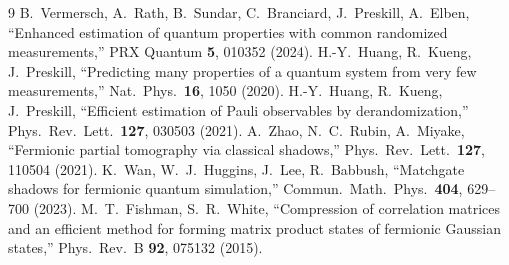 \documentclass[11pt,a4paper]{ltjsarticle}
\begin{document}
\begin{thebibliography}{9}
 B.~Vermersch, A.~Rath, B.~Sundar, C.~Branciard, J.~Preskill, A.~Elben, ``Enhanced estimation of quantum properties with common randomized measurements,'' PRX Quantum \textbf{5}, 010352 (2024).
 H.-Y.~Huang, R.~Kueng, J.~Preskill, ``Predicting many properties of a quantum system from very few measurements,'' Nat.\ Phys.\ \textbf{16}, 1050 (2020).
 H.-Y.~Huang, R.~Kueng, J.~Preskill, ``Efficient estimation of Pauli observables by derandomization,'' Phys.\ Rev.\ Lett.\ \textbf{127}, 030503 (2021).
 A.~Zhao, N.~C.~Rubin, A.~Miyake, ``Fermionic partial tomography via classical shadows,'' Phys.\ Rev.\ Lett.\ \textbf{127}, 110504 (2021).
 K.~Wan, W.~J.~Huggins, J.~Lee, R.~Babbush, ``Matchgate shadows for fermionic quantum simulation,'' Commun.\ Math.\ Phys.\ \textbf{404}, 629--700 (2023).
 M.~T.~Fishman, S.~R.~White, ``Compression of correlation matrices and an efficient method for forming matrix product states of fermionic Gaussian states,'' Phys.\ Rev.\ B \textbf{92}, 075132 (2015).
\end{thebibliography}
\end{document}
